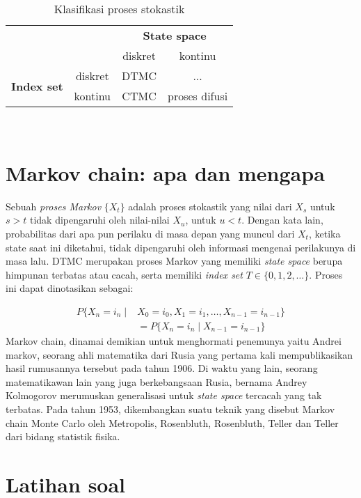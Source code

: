 \documentclass[11pt,b5paper,twoside]{book}
\newcommand{\sspace}{\textit{state space }}
\begin{document}
		\begin{table}[ht] 
			\caption{Klasifikasi proses stokastik}\label{Klasifikasi proses stokastik}
			
			\centering
			\begin{tabular}{cc|cc}
				& & \multicolumn{2}{|c}{\textbf{State space}}  \\
				& & diskret & kontinu\\
				\hline
				\multirow{2}{*}{\textbf{Index set}} & diskret & DTMC & ...\\
				& kontinu & CTMC & proses difusi\\
				\hline
			\end{tabular}
		\\[1.5pt]
		\end{table}
	
	\section{Markov chain: apa dan mengapa} %
	\noindent Sebuah \textit{proses Markov} $\{X_t\}$ adalah proses stokastik yang nilai dari $X_s$ untuk $s > t$ tidak dipengaruhi oleh nilai-nilai $X_u$, untuk $u < t$. Dengan kata lain, probabilitas dari apa pun perilaku di masa depan yang muncul dari $X_t$, ketika state saat ini diketahui, tidak dipengaruhi oleh informasi mengenai perilakunya di masa lalu. DTMC merupakan proses Markov yang memiliki \sspace berupa himpunan terbatas atau cacah, serta memiliki \textit{index set} $T \in \{0,1,2, \dots\}$. Proses ini dapat dinotasikan sebagai:

		\begin{equation}
		\begin{aligned}
		P\{X_n = i_n \mid &X_0 = i_0, X_1 =i_1, \ldots,X _{n-1}=i_{n-1}\}\\
		&= P\{X_n = i_n \mid X_{n-1}=i_{n-1}\}
		\end{aligned}
		\end{equation}
	\noindent Markov chain, dinamai demikian untuk menghormati penemunya yaitu Andrei markov, seorang ahli matematika dari Rusia yang pertama kali mempublikasikan hasil rumusannya tersebut pada tahun 1906. Di waktu yang lain, seorang matematikawan lain yang juga berkebangsaan Rusia, bernama Andrey Kolmogorov merumuskan generalisasi untuk \sspace tercacah yang tak terbatas.	Pada tahun 1953, dikembangkan suatu teknik yang disebut Markov chain Monte Carlo oleh Metropolis, Rosenbluth, Rosenbluth, Teller dan Teller dari bidang statistik fisika. 
	\section*{Latihan soal} %
\end{document}
